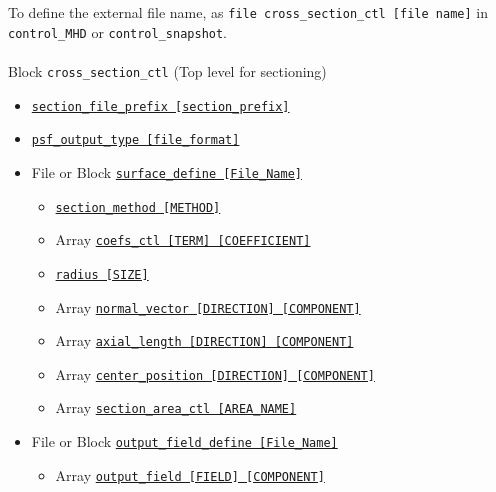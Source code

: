 To define the external file name, as \verb|file cross_section_ctl [file name]| in \verb|control_MHD| or \verb|control_snapshot|. \\
\\
%
Block \verb|cross_section_ctl| (Top level for sectioning)
\label{href_i:cross_section_ctl}
\begin{itemize}
	\item \hyperref[href_t:section_file_prefix]
			{\tt section\_file\_prefix    [section\_prefix]}
	\item \hyperref[href_t:psf_output_type]
			{\tt psf\_output\_type        [file\_format]}
	\item File or Block \hyperref[href_t:surface_define]{\tt surface\_define    [File\_Name]}
		\begin{itemize}
			\item \hyperref[href_t:section_method]
				{\tt section\_method    [METHOD]}
			\item Array \hyperref[href_t:psf_coefs_ctl]
				{\tt coefs\_ctl        [TERM]         [COEFFICIENT]}
			\item \hyperref[href_t:psf_radius]{\tt radius    [SIZE]}
			\item Array \hyperref[href_t:psf_normal_vector]
				{\tt normal\_vector    [DIRECTION]    [COMPONENT]}
			\item Array \hyperref[href_t:psf_axial_length]
                {\tt axial\_length     [DIRECTION]    [COMPONENT]}
			\item Array \hyperref[href_t:psf_center_position]
                {\tt center\_position  [DIRECTION]    [COMPONENT]}
%
			\item Array \hyperref[href_t:section_area_ctl]
				{\tt section\_area\_ctl        [AREA\_NAME]}
	\end{itemize}
%
	\item File or Block \hyperref[href_t:output_field_define]{\tt output\_field\_define    [File\_Name]}
		\begin{itemize}
			\item Array \hyperref[href_t:psf_output_field]
                {\tt output\_field     [FIELD]    [COMPONENT]}
		\end{itemize}
\end{itemize}

